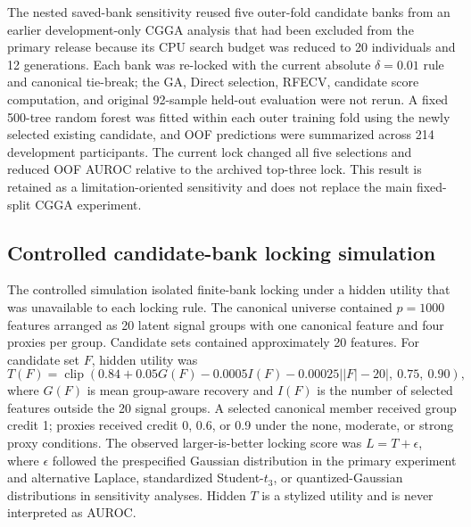 The nested saved-bank sensitivity reused five outer-fold candidate banks from an earlier development-only CGGA analysis that had been excluded from the primary release because its CPU search budget was reduced to 20 individuals and 12 generations. Each bank was re-locked with the current absolute \(\delta=0.01\) rule and canonical tie-break; the GA, Direct selection, RFECV, candidate score computation, and original 92-sample held-out evaluation were not rerun. A fixed 500-tree random forest was fitted within each outer training fold using the newly selected existing candidate, and OOF predictions were summarized across 214 development participants. The current lock changed all five selections and reduced OOF AUROC relative to the archived top-three lock. This result is retained as a limitation-oriented sensitivity and does not replace the main fixed-split CGGA experiment.

\subsection{Controlled candidate-bank locking simulation}

The controlled simulation isolated finite-bank locking under a hidden utility that was unavailable to each locking rule. The canonical universe contained $p=1000$ features arranged as 20 latent signal groups with one canonical feature and four proxies per group. Candidate sets contained approximately 20 features. For candidate set $F$, hidden utility was
\begin{equation}
T(F)=\operatorname{clip}\left(0.84+0.05G(F)-0.0005I(F)-0.00025\left||F|-20\right|,\ 0.75,\ 0.90\right),
\end{equation}
where $G(F)$ is mean group-aware recovery and $I(F)$ is the number of selected features outside the 20 signal groups. A selected canonical member received group credit 1; proxies received credit 0, 0.6, or 0.9 under the none, moderate, or strong proxy conditions. The observed larger-is-better locking score was $L=T+\epsilon$, where $\epsilon$ followed the prespecified Gaussian distribution in the primary experiment and alternative Laplace, standardized Student-$t_3$, or quantized-Gaussian distributions in sensitivity analyses. Hidden $T$ is a stylized utility and is never interpreted as AUROC.


